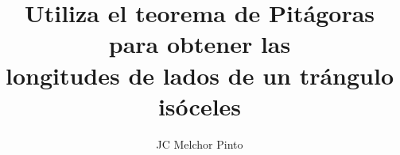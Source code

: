 \documentclass[12pt,addpoints]{guia}
\title{Utiliza el teorema de Pitágoras para obtener las \\longitudes de lados de un trángulo isóceles}
\author{JC Melchor Pinto}
\begin{document}
\INFO%
\begin{multicols}{2}
    
    
    
    
\end{multicols}%
\ejemplosboxed[]
\begin{questions}
    \questionboxed[10]{}
    \questionboxed[10]{}
    \ejemplosboxed[]
    \questionboxed[10]{}
    \questionboxed[10]{}
    \questionboxed[10]{}
    \ejemplosboxed[]
    \questionboxed[10]{}
    \questionboxed[10]{}
    \questionboxed[10]{}
    \ejemplosboxed[]
    \questionboxed[10]{}
    \questionboxed[10]{}
\end{questions}
\end{document}
